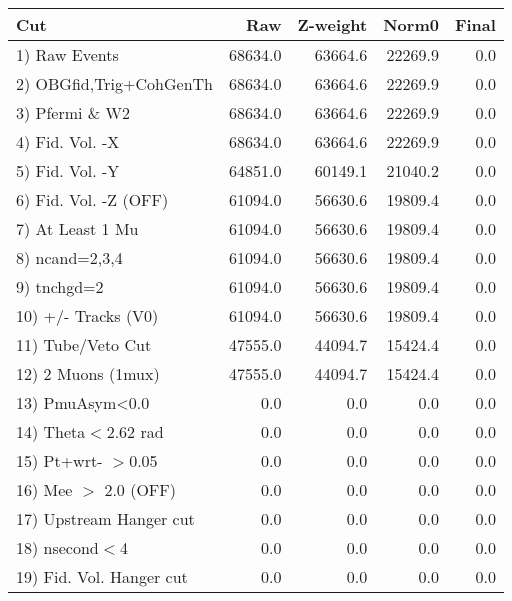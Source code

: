  \begin{table}[h!]\centering
 \begin{tabular}{||l||r|r|r|r||}
 \hline
 \hline
 Cut & Raw & Z-weight & Norm0 & Final \\
 \hline
  1) Raw Events           &     68634.0 &     63664.6 &     22269.9 &         0.0 \\
  2) OBGfid,Trig+CohGenTh &     68634.0 &     63664.6 &     22269.9 &         0.0 \\
  3) Pfermi \& W2         &     68634.0 &     63664.6 &     22269.9 &         0.0 \\
  4) Fid. Vol. -X         &     68634.0 &     63664.6 &     22269.9 &         0.0 \\
  5) Fid. Vol. -Y         &     64851.0 &     60149.1 &     21040.2 &         0.0 \\
  6) Fid. Vol. -Z (OFF)   &     61094.0 &     56630.6 &     19809.4 &         0.0 \\
  7) At Least 1 Mu        &     61094.0 &     56630.6 &     19809.4 &         0.0 \\
  8) ncand=2,3,4          &     61094.0 &     56630.6 &     19809.4 &         0.0 \\
  9) tnchgd=2             &     61094.0 &     56630.6 &     19809.4 &         0.0 \\
 10) +/- Tracks (V0)      &     61094.0 &     56630.6 &     19809.4 &         0.0 \\
 11) Tube/Veto Cut        &     47555.0 &     44094.7 &     15424.4 &         0.0 \\
 12) 2 Muons (1mux)       &     47555.0 &     44094.7 &     15424.4 &         0.0 \\
 13) PmuAsym<0.0          &         0.0 &         0.0 &         0.0 &         0.0 \\
 14) Theta$<$2.62 rad     &         0.0 &         0.0 &         0.0 &         0.0 \\
 15) Pt+wrt- $>$0.05      &         0.0 &         0.0 &         0.0 &         0.0 \\
 16) Mee $>$ 2.0  (OFF)   &         0.0 &         0.0 &         0.0 &         0.0 \\
 17) Upstream Hanger cut  &         0.0 &         0.0 &         0.0 &         0.0 \\
 18) nsecond$<$4          &         0.0 &         0.0 &         0.0 &         0.0 \\
 19) Fid. Vol. Hanger cut &         0.0 &         0.0 &         0.0 &         0.0 \\

\end{tabular}
\end{table}
